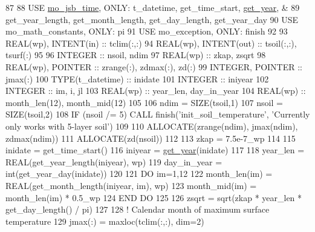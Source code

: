 \begin{DoxyCode}
87 
88     \textcolor{keywordtype}{USE }\hyperlink{namespacemo__jsb__time}{mo\_jsb\_time}\textcolor{keywordtype}{,       ONLY}: t\_datetime, get\_time\_start, \hyperlink{namespacemo__jsb__time_adf7b7e4156df6e151e9274d0d94dc601}{get\_year}, &
89                                  get\_year\_length, get\_month\_length, get\_day\_length, get\_year\_day
90     \textcolor{keywordtype}{USE }mo\_math\_constants\textcolor{keywordtype}{, ONLY}: pi
91     \textcolor{keywordtype}{USE }mo\_exception\textcolor{keywordtype}{,      ONLY}: finish
92 
93     \textcolor{keywordtype}{REAL(wp)}, \textcolor{keywordtype}{INTENT(in)}  :: tclim(:,:)
94     \textcolor{keywordtype}{REAL(wp)}, \textcolor{keywordtype}{INTENT(out)} :: tsoil(:,:), tsurf(:)
95 
96     \textcolor{keywordtype}{INTEGER} :: nsoil, ndim
97     \textcolor{keywordtype}{REAL(wp)} :: zkap, zsqrt
98     \textcolor{keywordtype}{REAL(wp)}, \textcolor{keywordtype}{POINTER} :: zrange(:), zdmax(:), zd(:)
99     \textcolor{keywordtype}{INTEGER}, \textcolor{keywordtype}{POINTER} :: jmax(:)
100     \textcolor{keywordtype}{TYPE}(t\_datetime) :: inidate
101     \textcolor{keywordtype}{INTEGER} :: iniyear
102     \textcolor{keywordtype}{INTEGER} :: im, i, jl
103     \textcolor{keywordtype}{REAL(wp)} :: year\_len, day\_in\_year
104     \textcolor{keywordtype}{REAL(wp)} :: month\_len(12), month\_mid(12)
105 
106     ndim  = \textcolor{keyword}{SIZE}(tsoil,1)
107     nsoil = \textcolor{keyword}{SIZE}(tsoil,2)
108     \textcolor{keywordflow}{IF} (nsoil /= 5) \textcolor{keyword}{CALL }finish(\textcolor{stringliteral}{'init\_soil\_temperature'}, \textcolor{stringliteral}{'Currently only works with 5-layer soil'})
109 
110     \textcolor{keyword}{ALLOCATE}(zrange(ndim), jmax(ndim), zdmax(ndim))
111     \textcolor{keyword}{ALLOCATE}(zd(nsoil))
112 
113     zkap = 7.5e-7\_wp
114 
115     inidate = get\_time\_start()
116     iniyear = \hyperlink{namespacemo__jsb__time_adf7b7e4156df6e151e9274d0d94dc601}{get\_year}(inidate)
117 
118     year\_len    = \textcolor{keywordtype}{REAL(get\_year\_length(iniyear)}, wp)
119     day\_in\_year = int(get\_year\_day(inidate))
120 
121     \textcolor{keywordflow}{DO} im=1,12
122       month\_len(im) = \textcolor{keywordtype}{REAL(get\_month\_length(iniyear, im)}, wp)
123       month\_mid(im) = month\_len(im) * 0.5\_wp
124 \textcolor{keywordflow}{    END DO}
125 
126     zsqrt = sqrt(zkap * year\_len * get\_day\_length() / pi)
127 
128     \textcolor{comment}{! Calendar month of maximum surface temperature}
129     jmax(:) = maxloc(tclim(:,:), dim=2)

\end{DoxyCode}
